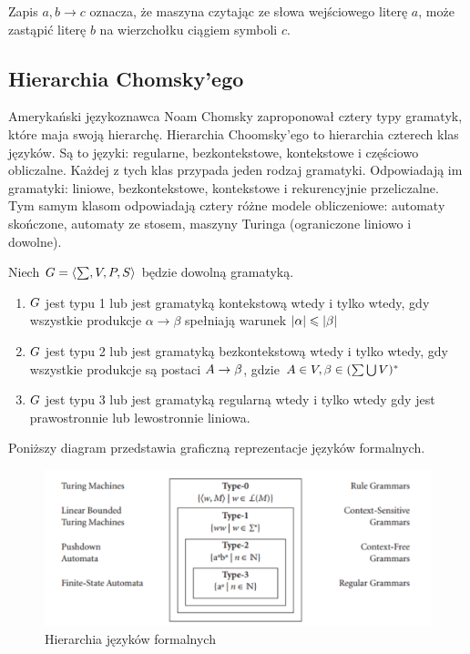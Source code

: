 	Zapis $a,b \rightarrow c$ oznacza, że maszyna czytając ze słowa wejściowego literę $a$, może zastąpić literę $b$ na wierzchołku ciągiem symboli $c$.




\subsection{Hierarchia Chomsky'ego}
Amerykański językoznawca Noam Chomsky zaproponował cztery typy gramatyk, które maja swoją hierarchę. Hierarchia Choomsky'ego to hierarchia czterech klas języków. Są to języki: regularne, bezkontekstowe, kontekstowe i częściowo obliczalne. Każdej z tych klas przypada jeden rodzaj gramatyki. Odpowiadają im gramatyki: liniowe, bezkontekstowe, kontekstowe i rekurencyjnie przeliczalne. Tym samym klasom odpowiadają cztery różne modele obliczeniowe: automaty skończone, automaty ze stosem, maszyny Turinga (ograniczone liniowo i dowolne). 

\begin{definicja}
	Niech $\mathnormal{G = \langle \sum, V, P, S \rangle}$ będzie dowolną gramatyką.\newline
	\begin{enumerate}
		\item $\mathnormal{G}$ jest typu 1 lub jest gramatyką kontekstową wtedy i tylko wtedy, gdy wszystkie produkcje $\alpha \rightarrow \beta$ spełniają warunek $\mathnormal{|\alpha| \leqslant |\beta|}$
		\item $\mathnormal{G}$ jest typu 2 lub jest gramatyką bezkontekstową wtedy i tylko wtedy, gdy wszystkie produkcje są postaci $\mathnormal{A \rightarrow \beta}$, gdzie $\mathnormal{A \in V, \beta \in (\sum \bigcup V)^{*}}$
		\item $\mathnormal{G}$  jest typu 3 lub jest gramatyką regularną wtedy i tylko wtedy gdy jest prawostronnie lub lewostronnie liniowa.
	\end{enumerate}
\end{definicja}
Poniższy diagram przedstawia graficzną reprezentacje języków formalnych.

\begin{figure}[H]
	\centering
	\includegraphics[width=0.7\linewidth]{hierarchia}
	\caption{Hierarchia języków formalnych}
	\label{fig:hierarchia}
\end{figure}

